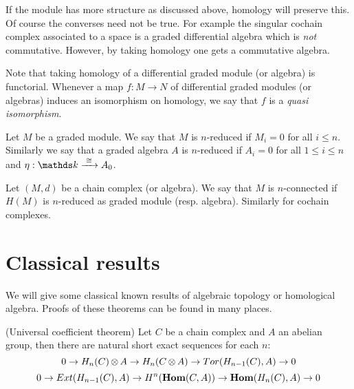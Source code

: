 
If the module has more structure as discussed above, homology will preserve this.
Of course the converses need not be true. For example the singular cochain complex associated to a space is a graded differential algebra which is \emph{not} commutative. However, by taking homology one gets a commutative algebra.

Note that taking homology of a differential graded module (or algebra) is functorial. Whenever a map $f: M \to N$ of differential graded modules (or algebras) induces an isomorphism on homology, we say that $f$ is a \emph{quasi isomorphism}.

\begin{definition}
	Let $M$ be a graded module. We say that $M$ is $n$-reduced if $M_i = 0$ for all $i \leq n$. Similarly we say that a graded algebra $A$ is $n$-reduced if $A_i = 0$ for all $1 \leq i \leq n$ and $\eta: \k \tot{\iso} A_0$.

	Let $(M, d)$ be a chain complex (or algebra). We say that $M$ is $n$-connected if $H(M)$ is $n$-reduced as graded module (resp. algebra). Similarly for cochain complexes.
\end{definition}


\section{Classical results}

We will give some classical known results of algebraic topology or homological algebra. Proofs of these theorems can be found in many places. 

\begin{theorem}
	(Universal coefficient theorem) Let $C$ be a chain complex and $A$ an abelian group, then there are natural short exact sequences for each $n$:
	$$ 0 \to H_n(C) \operatorname*{\otimes} A \to H_n(C \operatorname*{\otimes} A) \to Tor(H_{n-1}(C), A) \to 0 $$
	$$ 0 \to Ext(H_{n-1}(C), A) \to H^n(\mathbf{Hom}(C, A)) \to \mathbf{Hom}(H_n(C), A) \to 0 $$
\end{theorem}

